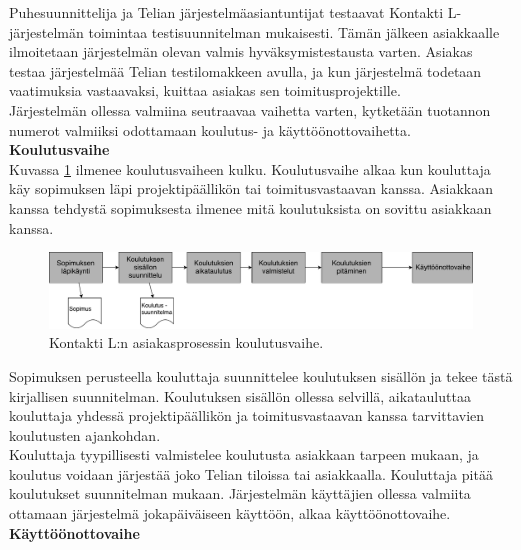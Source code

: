 \documentclass[finnish,12pt,a4paper,pdftex]{article}
\begin{document}
\noindent Puhesuunnittelija ja Telian järjestelmäasiantuntijat testaavat Kontakti L-järjestelmän toimintaa testisuunnitelman mukaisesti. Tämän jälkeen asiakkaalle ilmoitetaan järjestelmän olevan valmis hyväksymistestausta varten. Asiakas testaa järjestelmää Telian testilomakkeen avulla, ja kun järjestelmä todetaan vaatimuksia vastaavaksi, kuittaa asiakas sen toimitusprojektille. \\

\noindent Järjestelmän ollessa valmiina seutraavaa vaihetta varten, kytketään tuotannon numerot valmiiksi odottamaan koulutus- ja käyttöönottovaihetta.\\

\textbf{Koulutusvaihe}\\


\noindent Kuvassa \ref{fig:koulutus} ilmenee koulutusvaiheen kulku. Koulutusvaihe alkaa kun kouluttaja käy sopimuksen läpi projektipäällikön tai toimitusvastaavan kanssa. Asiakkaan kanssa tehdystä sopimuksesta ilmenee mitä koulutuksista on sovittu asiakkaan kanssa.

\begin{figure}[!h]
    \centering
    \includegraphics[scale=0.3]{images/koulutukset.pdf}
    \caption{Kontakti L:n asiakasprosessin koulutusvaihe.}
    \label{fig:koulutus}
\end{figure}

\noindent Sopimuksen perusteella kouluttaja suunnittelee koulutuksen sisällön ja tekee tästä kirjallisen suunnitelman. Koulutuksen sisällön ollessa selvillä, aikatauluttaa kouluttaja yhdessä projektipäällikön ja toimitusvastaavan kanssa tarvittavien koulutusten ajankohdan.\\

\noindent Kouluttaja tyypillisesti valmistelee koulutusta asiakkaan tarpeen mukaan, ja koulutus voidaan järjestää joko Telian tiloissa tai asiakkaalla. Kouluttaja pitää koulutukset suunnitelman mukaan. Järjestelmän käyttäjien ollessa valmiita ottamaan järjestelmä jokapäiväiseen käyttöön, alkaa käyttöönottovaihe.\\

\textbf{Käyttöönottovaihe}\\
\end{document}
